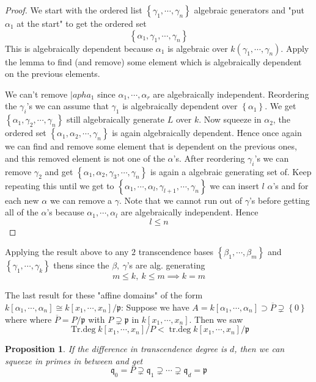 \documentclass[11pt,a4paper]{article}
\theoremstyle{definition}
\theoremstyle{plain}
\newtheorem{proposition}[definition]{Proposition}
\theoremstyle{remark}
\renewcommand{\set}[1]{\left\{ #1 \right\}}
\begin{document}
\begin{proof}
    We start with the ordered list $\set{\gamma_1, \cdots, \gamma_n}$ algebraic generators and "put $\alpha_1$ at the start" 
    to get the ordered set 
    $$\set{\alpha_1, \gamma_1, \cdots, \gamma_n}$$
    This is algebraically dependent because $\alpha_1$ is algebraic over $k(\gamma_1, \cdots, \gamma_n)$. Apply the lemma 
    to find (and remove) some element which is algebraically dependent on the previous elements. 
    
    We can't remove $|apha_1$ since $\alpha_1, \cdots, \alpha_r$ are algebraically independent. Reordering the $\gamma_i$'s 
    we can assume that $\gamma_1$ is algebraically dependent over $\set{\alpha_1}$. We get 
    $\set{\alpha_1, \gamma_2, \cdots, \gamma_n}$ still algebraically generate $L$ over $k$. 
    Now squeeze in $\alpha_2$, the ordered set $\set{\alpha_1, \alpha_2, \cdots, \gamma_n}$ is again 
    algebraically dependent. Hence once again we can find and remove some element that is dependent on 
    the previous ones, and this removed element is not one of the $\alpha$'s. After reordering $\gamma_i$'s we can remove $\gamma_2$ 
    and get $\set{\alpha_1, \alpha_2, \gamma_3, \cdots, \gamma_n}$ is again a algebraic generating set of. 
    Keep repeating this until we get to $\set{\alpha_1, \cdots, \alpha_l, \gamma_{l+1}, \cdots, \gamma_n}$ we can insert $l$ $\alpha$'s 
    and for each new $\alpha$ we can remove a $\gamma$. Note that we cannot run out of $\gamma$'s before getting all of the $\alpha$'s 
    because $\alpha_1, \cdots, \alpha_l$ are algebraically independent. Hence 
    $$l \le n$$
\end{proof}

Applying the result above to any $2$ transcendence bases $\set{\beta_1, \cdots, \beta_m}$ and $\set{\gamma_1, \cdots, \gamma_k}$ 
thens since the $\beta, \ \gamma$'s are alg. generating 
$$m \le k, \ k \le m \implies k = m$$

The last result for these "affine domains" of the form $k[\alpha_1, \cdots, \alpha_n] \cong k[x_1, \cdots, x_n] / \mathfrak{p}$: 
Suppose we have $A = k[\alpha_1, \cdots, \alpha_n] \supset \overline{P} \supsetneq \set{0}$ where where $\overline{P} = P/\mathfrak{p}$ with 
$P \supsetneq \mathfrak{p}$ in $k[x_1, \cdots, x_n]$. Then we saw 
$$\operatorname{Tr.deg} k[x_1, \cdots, x_n] / P < \operatorname{tr.deg} k[x_1, \cdots, x_n] / \mathfrak{p}$$

\begin{proposition}
    If the difference in transcendence degree is $d$, then we can squeeze in primes in between and get 
    $$\mathfrak{q}_0 = P \supsetneq \mathfrak{q}_1 \supsetneq \cdots \supsetneq \mathfrak{q}_d = \mathfrak{p}$$
\end{proposition}
\end{document}
